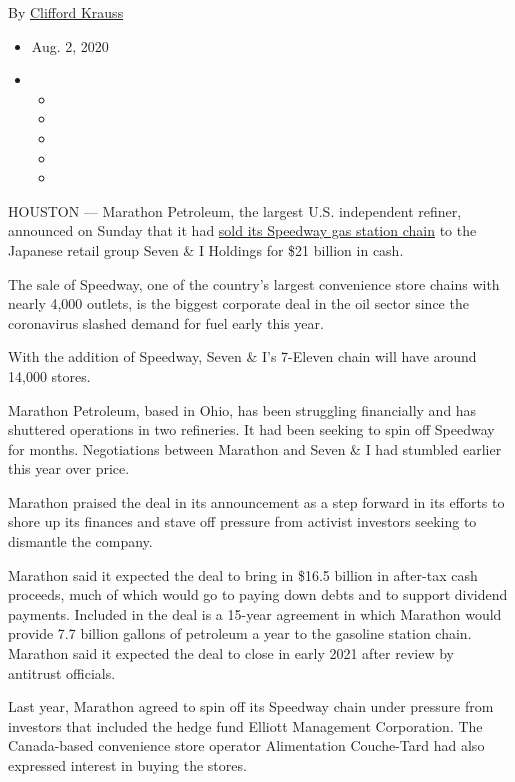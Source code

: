 By \href{https://www.nytimes3xbfgragh.onion/by/clifford-krauss}{Clifford
Krauss}

\begin{itemize}
\item
  Aug. 2, 2020
\item
  \begin{itemize}
  \item
  \item
  \item
  \item
  \item
  \end{itemize}
\end{itemize}

HOUSTON --- Marathon Petroleum, the largest U.S. independent refiner,
announced on Sunday that it had
\href{https://www.prnewswire.com/news-releases/marathon-petroleum-corp-announces-agreement-for-21-billion-sale-of-speedway-301104405.html}{sold
its Speedway gas station chain} to the Japanese retail group Seven \& I
Holdings for \$21 billion in cash.

The sale of Speedway, one of the country's largest convenience store
chains with nearly 4,000 outlets, is the biggest corporate deal in the
oil sector since the coronavirus slashed demand for fuel early this
year.

With the addition of Speedway, Seven \& I's 7-Eleven chain will have
around 14,000 stores.

Marathon Petroleum, based in Ohio, has been struggling financially and
has shuttered operations in two refineries. It had been seeking to spin
off Speedway for months. Negotiations between Marathon and Seven \& I
had stumbled earlier this year over price.

Marathon praised the deal in its announcement as a step forward in its
efforts to shore up its finances and stave off pressure from activist
investors seeking to dismantle the company.

Marathon said it expected the deal to bring in \$16.5 billion in
after-tax cash proceeds, much of which would go to paying down debts and
to support dividend payments. Included in the deal is a 15-year
agreement in which Marathon would provide 7.7 billion gallons of
petroleum a year to the gasoline station chain. Marathon said it
expected the deal to close in early 2021 after review by antitrust
officials.

Last year, Marathon agreed to spin off its Speedway chain under pressure
from investors that included the hedge fund Elliott Management
Corporation. The Canada-based convenience store operator Alimentation
Couche-Tard had also expressed interest in buying the stores.


